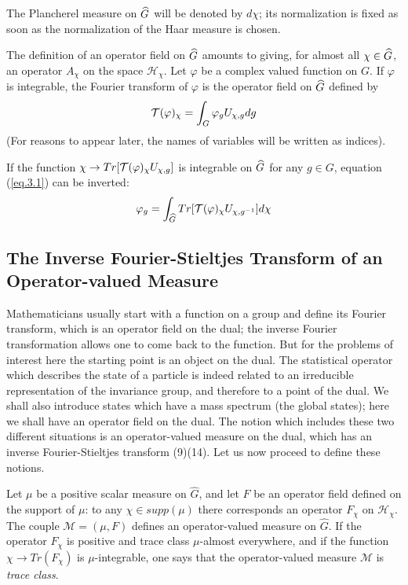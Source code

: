 \documentclass[a4paper,11pt]{article}
\def\Uc#1{U_{\chi,{#1}}}
\begin{document}
The Plancherel measure on $\widehat{G}$ will be denoted by $d\chi$; its normalization is fixed as soon 
as the normalization of the Haar measure is chosen. 

The definition of an operator field on $\widehat{G}$ amounts to giving, for almost all $\chi \in  \widehat{G}$, 
an operator $A_{\chi}$ on the space $\mathcal{H}_{\chi}$. Let $\varphi$ be a complex valued 
function on $G$. If $\varphi$ is integrable, the Fourier 
transform of $\varphi$  is the operator field on $\widehat{G}$ defined by
\begin{equation}
 \label{eq.3.1}
   \mathcal{T}(\varphi)_{\chi} = \int_G \varphi_g U_{\chi,g} dg
\end{equation}
(For reasons to appear later, the names of variables will be written as indices). 

If the function $ \chi \rightarrow Tr[\mathcal{T}(\varphi)_{\chi} U_{\chi,g}]$ is integrable on $\widehat{G}$ 
for any $g \in G$, equation (\ref{eq.3.1}) can be inverted:
\begin{equation}
 \label{eq.3.2}
 \varphi_g = \int_{\Gc} Tr[\mathcal{T}(\varphi)_{\chi} \Uc{g^{-1}}] d\chi
\end{equation}

\subsection{The Inverse Fourier-Stieltjes Transform of an Operator-valued Measure}

Mathematicians usually start with a function on a group and define its Fourier transform, which 
is an operator field on the dual; the inverse Fourier transformation allows one to come back to 
the function. But for the problems of interest here the starting point is an object on the 
dual. The statistical operator which describes the state of a particle is indeed related to an 
irreducible representation of the invariance group, and therefore to a point of the dual. We 
shall also introduce states which have a mass spectrum (the global states); here we shall have 
an operator field on the dual. The notion which includes these two different situations is an 
operator-valued measure on the dual, which has an inverse Fourier-Stieltjes transform (9)(14). 
Let us now proceed to define these notions. 

Let $\mu$ be a positive scalar measure on $\widehat{G}$, and let $F$ be an operator field 
defined on 
the support of $\mu$: to any $\chi \in supp(\mu)$ there corresponds an operator $F_{\chi}$ on 
$\mathcal{H}_{\chi}$.  The couple $\mathcal{M} = (\mu,F) $
defines an operator-valued measure on $\widehat{G}$. If the operator $F_{\chi}$ is positive and 
trace class $\mu$-almost everywhere, and if the function 
$\chi \rightarrow Tr(F_{\chi})$ is $\mu$-integrable, one says that the operator-valued measure 
$\mathcal{M}$ is {\it trace class}. 
\end{document}
